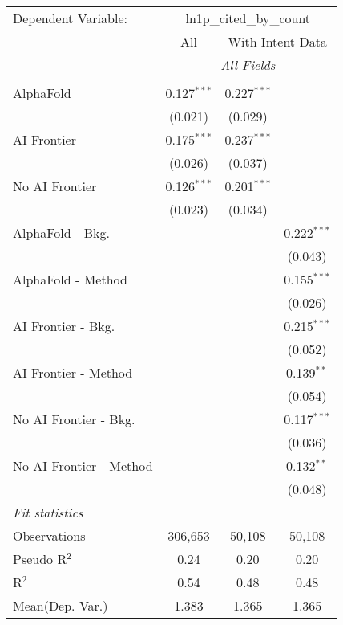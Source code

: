 \begingroup
\centering
\begin{tabular}{lccc}
   \tabularnewline \midrule \midrule
   Dependent Variable: & \multicolumn{3}{c}{ln1p\_cited\_by\_count}\\
 & \multicolumn{1}{c}{All} & \multicolumn{2}{c}{With Intent Data} \\
\cmidrule(lr){2-2} \cmidrule(lr){3-4}
 & \multicolumn{3}{c}{\textit{All Fields}} \\ \\
   AlphaFold               & 0.127$^{***}$ & 0.227$^{***}$ &   \\   
                           & (0.021)       & (0.029)       &   \\   
   AI Frontier             & 0.175$^{***}$ & 0.237$^{***}$ &   \\   
                           & (0.026)       & (0.037)       &   \\   
   No AI Frontier          & 0.126$^{***}$ & 0.201$^{***}$ &   \\   
                           & (0.023)       & (0.034)       &   \\   
   AlphaFold - Bkg.        &               &               & 0.222$^{***}$\\   
                           &               &               & (0.043)\\   
   AlphaFold - Method      &               &               & 0.155$^{***}$\\   
                           &               &               & (0.026)\\   
   AI Frontier - Bkg.      &               &               & 0.215$^{***}$\\   
                           &               &               & (0.052)\\   
   AI Frontier - Method    &               &               & 0.139$^{**}$\\   
                           &               &               & (0.054)\\   
   No AI Frontier - Bkg.   &               &               & 0.117$^{***}$\\   
                           &               &               & (0.036)\\   
   No AI Frontier - Method &               &               & 0.132$^{**}$\\   
                           &               &               & (0.048)\\   
   \midrule
   \emph{Fit statistics}\\
   Observations            & 306,653       & 50,108        & 50,108\\  
   Pseudo R$^2$            & 0.24          & 0.20          & 0.20\\  
   R$^2$                   & 0.54          & 0.48          & 0.48\\  
Mean(Dep. Var.) & 1.383 & 1.365 & 1.365 \\
   

\end{tabular}
